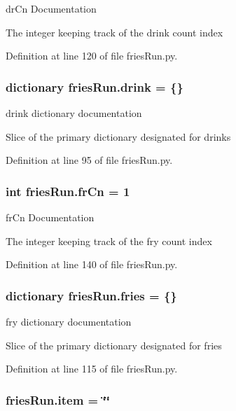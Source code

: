 dr\-Cn Documentation 

The integer keeping track of the drink count index 

Definition at line 120 of file fries\-Run.\-py.

\hypertarget{namespacefriesRun_a937dc5e8de6b101839e8db69657564cd}{
\subsubsection[{drink}]{\setlength{\rightskip}{0pt plus 5cm}dictionary fries\-Run.\-drink = \{\}}}\label{namespacefriesRun_a937dc5e8de6b101839e8db69657564cd}


drink dictionary documentation 

Slice of the primary dictionary designated for drinks 

Definition at line 95 of file fries\-Run.\-py.

\hypertarget{namespacefriesRun_a30e039de08fd01c2eaf9a8d74b95c910}{
\subsubsection[{fr\-Cn}]{\setlength{\rightskip}{0pt plus 5cm}int fries\-Run.\-fr\-Cn = 1}}\label{namespacefriesRun_a30e039de08fd01c2eaf9a8d74b95c910}


fr\-Cn Documentation 

The integer keeping track of the fry count index 

Definition at line 140 of file fries\-Run.\-py.

\hypertarget{namespacefriesRun_a98803ff109f505831d37ef278dd8ef6b}{
\subsubsection[{fries}]{\setlength{\rightskip}{0pt plus 5cm}dictionary fries\-Run.\-fries = \{\}}}\label{namespacefriesRun_a98803ff109f505831d37ef278dd8ef6b}


fry dictionary documentation 

Slice of the primary dictionary designated for fries 

Definition at line 115 of file fries\-Run.\-py.

\hypertarget{namespacefriesRun_a0fc799d205c8f18618a32b13c5a28000}{
\subsubsection[{item}]{\setlength{\rightskip}{0pt plus 5cm}fries\-Run.\-item = \char`\"{}\char`\"{}}}\label{namespacefriesRun_a0fc799d205c8f18618a32b13c5a28000}


